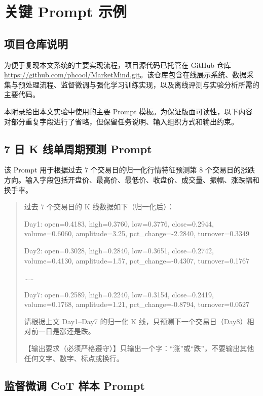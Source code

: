 
\chapter{关键 Prompt 示例}

\section{项目仓库说明}

为便于复现本文系统的主要实现流程，项目源代码已托管在 GitHub 仓库 \url{https://github.com/phcool/MarketMind.git}。该仓库包含在线展示系统、数据采集与预处理流程、监督微调与强化学习训练实现，以及离线评测与实验分析所需的主要代码。

本附录给出本文实验中使用的主要 Prompt 模板。为保证版面可读性，以下内容对部分重复字段进行了省略，但保留任务说明、输入组织方式和输出约束。

\section{7 日 K 线单周期预测 Prompt}

该 Prompt 用于根据过去 7 个交易日的归一化行情特征预测第 8 个交易日的涨跌方向。输入字段包括开盘价、最高价、最低价、收盘价、成交量、振幅、涨跌幅和换手率。

\begin{quote}\small
过去 7 个交易日的 K 线数据如下（归一化后）：

Day1: open=0.4183, high=0.3760, low=0.3776, close=0.2944, volume=0.6060, amplitude=3.25, pct\_change=-2.2840, turnover=0.3349

Day2: open=0.3028, high=0.2840, low=0.3651, close=0.2742, volume=0.4130, amplitude=1.57, pct\_change=-0.4307, turnover=0.1767

……

Day7: open=0.2589, high=0.2240, low=0.3154, close=0.2419, volume=0.1768, amplitude=1.21, pct\_change=-0.8794, turnover=0.0527

请根据上文 Day1--Day7 的归一化 K 线，只预测下一个交易日（Day8）相对前一日是涨还是跌。

【输出要求（必须严格遵守）】只输出一个字：“涨”或“跌”，不要输出其他任何文字、数字、标点或换行。
\end{quote}

\section{监督微调 CoT 样本 Prompt}

